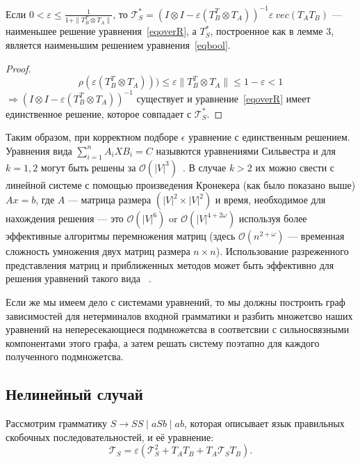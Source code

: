 \documentclass[12pt]{matmex-diploma-custom}
\begin{document}
\begin{theorem}
Если $\displaystyle  0 < \varepsilon \leq \frac{1}{1 + \| T_B^T \otimes T_A\|}$, то $\mathcal{T}_S^* = (I \otimes I - \varepsilon (T_B^T \otimes T_A))^{-1} \varepsilon \ vec(T_AT_B)$ --- наименьшее решение  уравнения~\ref{eqoverR}, а $T_S^*$, построенное как в лемме 3, является наименьшим решением уравнения~\ref{eqbool}.
\end{theorem}

\begin{proof}
$$\mathbb{\rho} (\varepsilon (T_B^T \otimes T_A))) \leq \varepsilon \|T_B^T \otimes T_A\|  \leq 1 -\varepsilon < 1$$ 
$\Rightarrow (I \otimes I - \varepsilon (T_B^T \otimes T_A))^{-1}$ существует и уравнение~\ref{eqoverR} имеет единственное решение, которое совпадает с $\mathcal{T}_S^*$. 
\end{proof}

Таким образом, при корректном подборе $\epsilon$ уравнение с единственным решением. 
Уравнения вида $\sum_{i=1}^n A_iXB_i = C$ назывются уравнениями Сильвестра и для $k = 1, 2$ могут быть решены за  $\mathcal{O}(|V|^3)$~\cite{Bartels:1972:SME:361573.361582}. 
В случае $k > 2$ их можно свести с линейной системе с помощью произведения Кронекера (как было показано выше) $Ax = b$, где $A$ --- матрица размера  $(|V|^2\times|V|^2)$ и время, необходимое для нахождения решения --- это  $\mathcal{O}(|V|^6)$ or $\mathcal{O}(|V|^{4+2\omega})$ используя более эффективные алгоритмы перемножения матриц (здесь $\mathcal{O}(n^{2+\omega})$ --- временная сложность умножения двух матриц размера $n \times n$).
Использование разреженного представления матриц и приближенных методов может быть эффективно для решения уравнений такого вида ~\cite{bouhamidi2008}.

Если же мы имеем дело с системами уравнений, то мы должны построить граф зависимостей для нетерминалов входной грамматики и разбить множетсво наших уравнений на непересекающиеся подмножетсва в соответсвии с сильносвязными компонентами этого графа, а затем решать систему поэтапно для каждого полученного подмножетсва.


\subsection{Нелинейный случай}

Рассмотрим грамматику $S \rightarrow SS \mid aSb \mid ab$, которая описывает язык правильных скобочных последовательностей, и её уравнение:
\begin{equation*}
    \mathcal{T}_S = \varepsilon (\mathcal{T}^2_S +  T_AT_B + T_A\mathcal{T}_S T_B).
\end{equation*}
\end{document}
